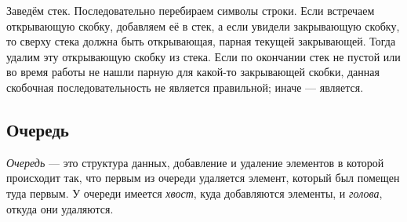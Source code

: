 Заведём стек. Последовательно перебираем символы строки. Если встречаем открывающую скобку, добавляем её в стек, а если увидели закрывающую скобку, то сверху стека должна быть открывающая, парная текущей закрывающей. Тогда удалим эту открывающую скобку из стека. Если по окончании стек не пустой или во время работы не нашли парную для какой-то закрывающей скобки, данная скобочная последовательность не является правильной; иначе --- является.

\subsection{Очередь}

\begin{definition}
    \textit{Очередь} --- это структура данных, добавление и удаление элементов в которой происходит так, что первым из очереди удаляется элемент, который был помещен туда первым. У очереди имеется \textit{хвост}, куда добавляются элементы, и \textit{голова}, откуда они удаляются. 
\end{definition}

\begin{center}
    \hspace{2cm}

    \hspace{1cm}
\end{center}

